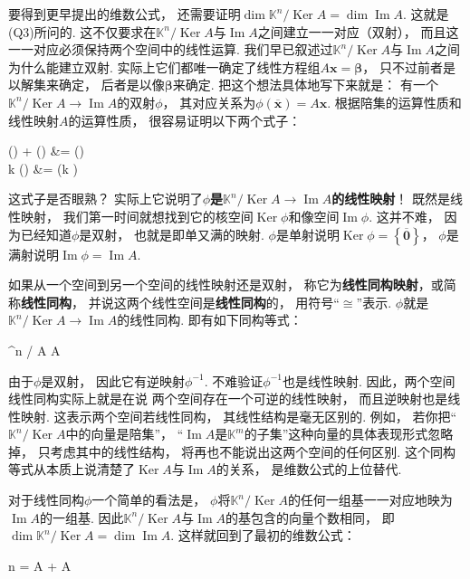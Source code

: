 要得到更早提出的维数公式，
还需要证明$\dim\mathbb{K}^n / \operatorname{Ker}A = \dim\operatorname{Im}A$.
这就是(Q3)所问的.
这不仅要求在$\mathbb{K}^n / \operatorname{Ker}A$与$\operatorname{Im}A$之间建立一一对应（双射），
而且这一一对应必须保持两个空间中的线性运算.
我们早已叙述过$\mathbb{K}^n / \operatorname{Ker}A$与$\operatorname{Im}A$之间为什么能建立双射.
实际上它们都唯一确定了线性方程组$A\bm{x} = \bm{\beta}$，
只不过前者是以解集来确定，
后者是以像$\bm{\beta}$来确定.
把这个想法具体地写下来就是：
有一个$\mathbb{K}^n / \operatorname{Ker}A \to \operatorname{Im}A$的双射$\phi$，
其对应关系为$\phi (\overline{\bm{x}}) = A \bm{x}$.
根据陪集的运算性质和线性映射$A$的运算性质，
很容易证明以下两个式子：
\begin{eq1}
    \phi() + \phi() &= \phi() \\[6pt]
    k \phi()  &=  \phi(k ) \end{eq1}

这式子是否眼熟？
实际上它说明了\textbf{$\phi$是}$\mathbb{K}^n / \operatorname{Ker}A \to \operatorname{Im}A$\textbf{的线性映射}！
既然是线性映射，
我们第一时间就想找到它的核空间$\operatorname{Ker}\phi$和像空间$\operatorname{Im}\phi$.
这并不难，
因为已经知道$\phi$是双射，
也就是即单又满的映射.
$\phi$是单射说明$\operatorname{Ker}\phi = \left\{ \overline{\bm{0}} \right\}$，
$\phi$是满射说明$\operatorname{Im}\phi = \operatorname{Im}A$.

如果从一个空间到另一个空间的线性映射还是双射，
称它为\textbf{线性同构映射}，或简称\textbf{线性同构}，
并说这两个线性空间是\textbf{线性同构}的，
用符号“$\cong$”表示.
$\phi$就是$\mathbb{K}^n / \operatorname{Ker}A \to \operatorname{Im}A$的线性同构.
即有如下同构等式：
\begin{eq1}
    ^n / A \cong {}A \end{eq1}

由于$\phi$是双射，
因此它有逆映射$\phi^{-1}$.
不难验证$\phi^{-1}$也是线性映射.
因此，两个空间线性同构实际上就是在说
两个空间存在一个可逆的线性映射，
而且逆映射也是线性映射.
这表示两个空间若线性同构，
其线性结构是毫无区别的.
例如，
若你把“$\mathbb{K}^n / \operatorname{Ker}A$中的向量是陪集”，
“$\operatorname{Im}A$是$\mathbb{K}^m$的子集”这种向量的具体表现形式忽略掉，
只考虑其中的线性结构，
将再也不能说出这两个空间的任何区别.
这个同构等式从本质上说清楚了$\operatorname{Ker}A$与$\operatorname{Im}A$的关系，
是维数公式的上位替代.

对于线性同构$\phi$一个简单的看法是，
$\phi$将$\mathbb{K}^n / \operatorname{Ker}A$的任何一组基一一对应地映为$\operatorname{Im}A$的一组基.
因此$\mathbb{K}^n / \operatorname{Ker}A$与$\operatorname{Im}A$的基包含的向量个数相同，
即$\dim\mathbb{K}^n / \operatorname{Ker}A = \dim\operatorname{Im}A$.
这样就回到了最初的维数公式：
\begin{eq1}
    n = \dim{}A + \dim{}A \end{eq1}
